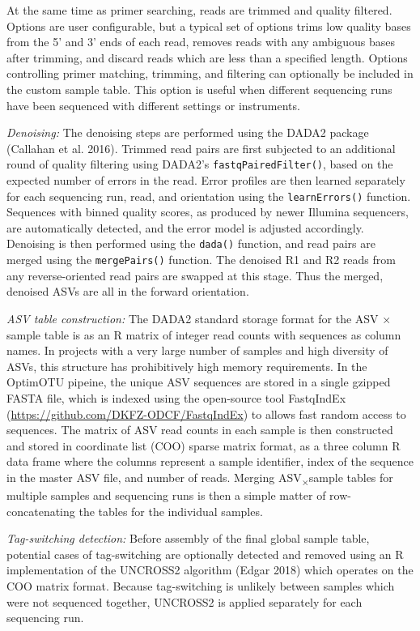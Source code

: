 \documentclass[
]{article}
\begin{document}
At the same time as primer searching, reads are trimmed and quality filtered.
Options are user configurable, but a typical set of options trims low quality bases from the 5' and 3' ends of each read, removes reads with any ambiguous bases after trimming, and discard reads which are less than a specified length.
Options controlling primer matching, trimming, and filtering can optionally be included in the custom sample table.
This option is useful when different sequencing runs have been sequenced with different settings or instruments.

\emph{Denoising:}
The denoising steps are performed using the DADA2 package (Callahan et al. 2016).
Trimmed read pairs are first subjected to an additional round of quality filtering using DADA2's \texttt{fastqPairedFilter()}, based on the expected number of errors in the read.
Error profiles are then learned separately for each sequencing run, read, and orientation using the \texttt{learnErrors()} function.
Sequences with binned quality scores, as produced by newer Illumina sequencers, are automatically detected, and the error model is adjusted accordingly.
Denoising is then performed using the \texttt{dada()} function, and read pairs are merged using the \texttt{mergePairs()} function.
The denoised R1 and R2 reads from any reverse-oriented read pairs are swapped at this stage.
Thus the merged, denoised ASVs are all in the forward orientation.

\emph{ASV table construction:}
The DADA2 standard storage format for the ASV × sample table is as an R matrix of integer read counts with sequences as column names.
In projects with a very large number of samples and high diversity of ASVs, this structure has prohibitively high memory requirements.
In the OptimOTU pipeine, the unique ASV sequences are stored in a single gzipped FASTA file, which is indexed using the open-source tool FastqIndEx (\url{https://github.com/DKFZ-ODCF/FastqIndEx}) to allows fast random access to sequences.
The matrix of ASV read counts in each sample is then constructed and stored in coordinate list (COO) sparse matrix format, as a three column R data frame where the columns represent a sample identifier, index of the sequence in the master ASV file, and number of reads.
Merging ASV\textsubscript{×}sample tables for multiple samples and sequencing runs is then a simple matter of row-concatenating the tables for the individual samples.

\emph{Tag-switching detection:}
Before assembly of the final global sample table, potential cases of tag-switching are optionally detected and removed using an R implementation of the UNCROSS2 algorithm (Edgar 2018) which operates on the COO matrix format.
Because tag-switching is unlikely between samples which were not sequenced together, UNCROSS2 is applied separately for each sequencing run.
\end{document}
